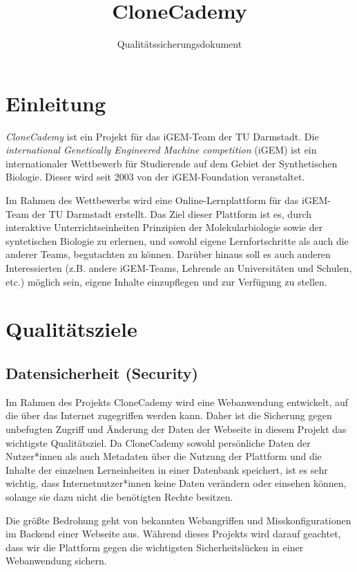 \documentclass[accentcolor=tud0b,12pt,paper=a4]{tudreport}
\title{CloneCademy}
\subtitle{Qualitätssicherungsdokument}
\begin{document}
\maketitle
\tableofcontents

\chapter{Einleitung}

\emph{CloneCademy} ist ein Projekt für das iGEM-Team der TU Darmstadt. Die \emph{international Genetically Engineered Machine competition} (iGEM) ist ein internationaler Wettbewerb für Studierende auf dem Gebiet der Synthetischen Biologie.
Dieser wird seit 2003 von der iGEM-Foundation veranstaltet.

Im Rahmen des Wettbewerbs wird eine Online-Lernplattform für das iGEM-Team der TU Darmstadt erstellt. Das Ziel dieser Plattform ist es, durch interaktive Unterrichtseinheiten Prinzipien der Molekularbiologie sowie der syntetischen Biologie zu erlernen, und sowohl eigene Lernfortschritte als auch die anderer Teams, begutachten zu können. Darüber hinaus soll es auch anderen Interessierten (z.B. andere iGEM-Teams, Lehrende an Universitäten und Schulen, etc.) möglich sein, eigene Inhalte einzupflegen und zur Verfügung zu stellen.

\chapter{Qualitätsziele}
\section{Datensicherheit (Security)}

Im Rahmen des Projekts CloneCademy wird eine Webanwendung entwickelt, auf die über das Internet zugegriffen werden kann. Daher ist die Sicherung gegen unbefugten Zugriff und Änderung der Daten der Webseite in diesem Projekt das wichtigste Qualitätsziel. Da CloneCademy sowohl persönliche Daten der Nutzer*innen als auch Metadaten über die Nutzung der Plattform und die Inhalte der einzelnen Lerneinheiten in einer Datenbank speichert, ist es sehr wichtig, dass Internetnutzer*innen keine Daten verändern oder einsehen können, solange sie dazu nicht die benötigten Rechte besitzen.

Die größte Bedrohung geht von bekannten Webangriffen und Misskonfigurationen im Backend einer Webseite aus. Während dieses Projekts wird darauf geachtet, dass wir die Plattform gegen die wichtigsten Sicherheitslücken in einer Webanwendung sichern.
\end{document}
